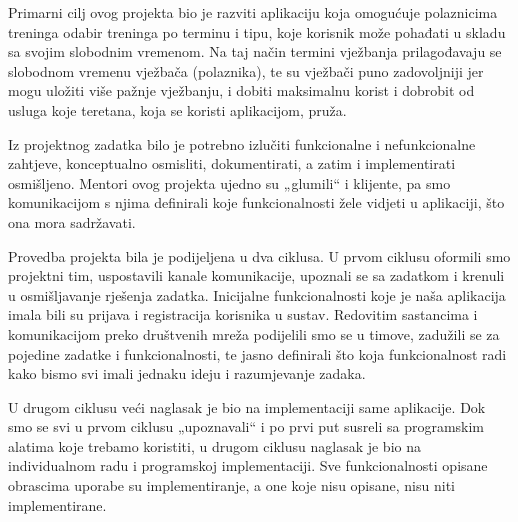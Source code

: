		
		
		{Primarni cilj ovog projekta bio je razviti aplikaciju koja omogućuje polaznicima treninga odabir treninga po terminu i tipu, koje korisnik može pohađati u skladu sa svojim slobodnim vremenom. Na taj način termini vježbanja prilagođavaju se slobodnom vremenu vježbača (polaznika), te su vježbači puno zadovoljniji jer mogu uložiti više pažnje vježbanju, i dobiti maksimalnu korist i dobrobit od usluga koje teretana, koja se koristi aplikacijom, pruža. \\}

        {Iz projektnog zadatka bilo je potrebno izlučiti funkcionalne i nefunkcionalne zahtjeve, konceptualno osmisliti, dokumentirati, a zatim i implementirati osmišljeno. Mentori ovog projekta ujedno su „glumili“ i klijente, pa smo komunikacijom s njima definirali koje funkcionalnosti žele vidjeti u aplikaciji, što ona mora sadržavati.  \\}

        {Provedba projekta bila je podijeljena u dva ciklusa. U prvom ciklusu oformili smo projektni tim, uspostavili kanale komunikacije, upoznali se sa zadatkom i krenuli u osmišljavanje rješenja zadatka. Inicijalne funkcionalnosti koje je naša aplikacija imala bili su prijava i registracija korisnika u sustav. Redovitim sastancima i komunikacijom preko društvenih mreža podijelili smo se u timove, zadužili se za pojedine zadatke i funkcionalnosti, te jasno definirali što koja funkcionalnost radi kako bismo svi imali jednaku ideju i razumjevanje zadaka. \\} 

        {U drugom ciklusu veći naglasak je bio na implementaciji same aplikacije. Dok smo se svi u prvom ciklusu „upoznavali“ i po prvi put susreli sa programskim alatima koje trebamo koristiti, u drugom ciklusu naglasak je bio na individualnom radu i programskoj implementaciji. Sve funkcionalnosti opisane obrascima uporabe su implementiranje, a one koje nisu opisane, nisu niti implementirane. \\}

